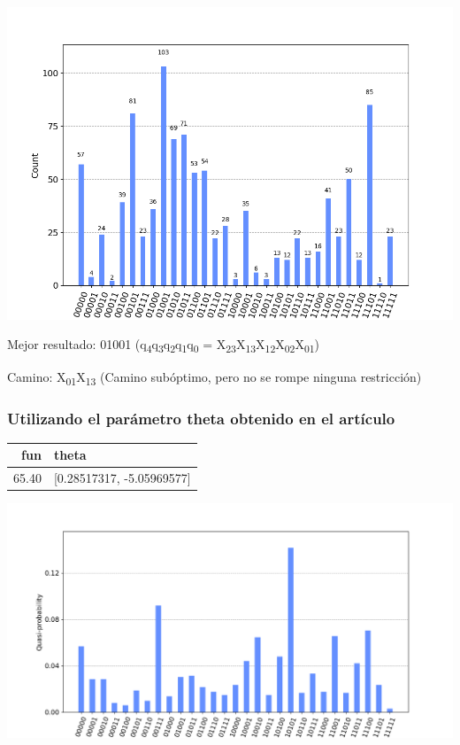 \documentclass[letterpaper]{article}
\begin{document}
\begin{center}
\includegraphics[scale=0.5]{../img/primer_grafo/sin_restriccion_extra/primer_paper_aer_suboptimo.png}
\end{center}

Mejor resultado: 01001 (q\textsubscript{4}q\textsubscript{3}q\textsubscript{2}q\textsubscript{1}q\textsubscript{0} = X\textsubscript{23}X\textsubscript{13}X\textsubscript{12}X\textsubscript{02}X\textsubscript{01})

Camino: X\textsubscript{01}X\textsubscript{13} (Camino subóptimo, pero no se rompe ninguna restricción)

\newpage

\subsubsection{Utilizando el parámetro \textbf{theta} obtenido en el artículo}
\label{sec:orga3b8b7d}

\begin{center}
\begin{tabular}{|r|l|}
\hline
\textbf{fun} & \textbf{theta}\\
\hline
65.40 & [0.28517317, -5.05969577]\\
\hline
\end{tabular}
\end{center}

\begin{center}
\includegraphics[scale=0.5]{../img/primer_grafo/sin_restriccion_extra/primer_paper_aer_resultado.png}
\end{center}
\end{document}
